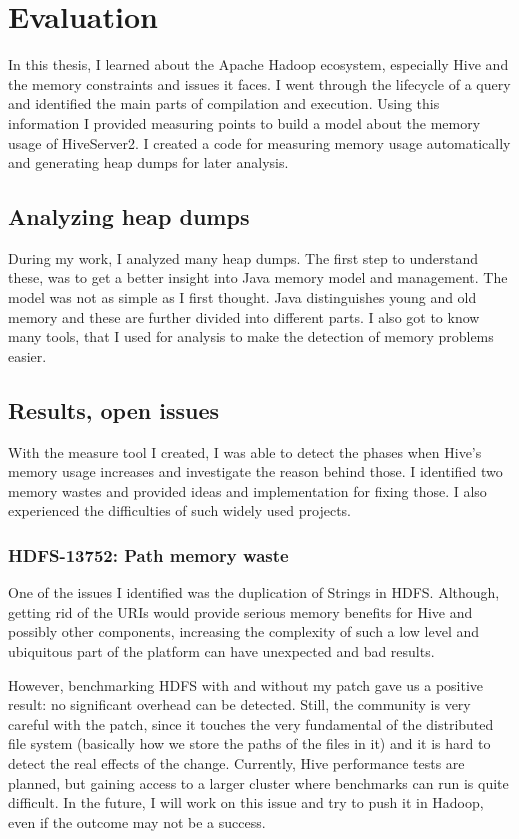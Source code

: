 \chapter{Evaluation}
In this thesis, I learned about the Apache Hadoop ecosystem, especially Hive and the memory constraints and issues it faces. I went through the lifecycle of a query and identified the main parts of compilation and execution. Using this information I provided measuring points to build a model about the memory usage of HiveServer2. I created a code for measuring memory usage automatically and generating heap dumps for later analysis.

\section{Analyzing heap dumps}
During my work, I analyzed many heap dumps. The first step to understand these, was to get a better insight into Java memory model and management. The model was not as simple as I first thought. Java distinguishes young and old memory and these are further divided into different parts. I also got to know many tools, that I used for analysis to make the detection of memory problems easier. 

\section{Results, open issues}
With the measure tool I created, I was able to detect the phases when Hive's memory usage increases and investigate the reason behind those. I identified two memory wastes and provided ideas and implementation for fixing those. I also experienced the difficulties of such widely used projects.

\subsection{HDFS-13752: Path memory waste}
One of the issues I identified was the duplication of Strings in HDFS. Although, getting rid of the URIs would provide serious memory benefits for Hive and possibly other components, increasing the complexity of such a low level and ubiquitous part of the platform can have unexpected and bad results. 

However, benchmarking HDFS with and without my patch gave us a positive result: no significant overhead can be detected. Still, the community is very careful with the patch, since it touches the very fundamental of the distributed file system (basically how we store the paths of the files in it) and it is hard to detect the real effects of the change. Currently, Hive performance tests are planned, but gaining access to a larger cluster where benchmarks can run is quite difficult. In the future, I will work on this issue and try to push it in Hadoop, even if the outcome may not be a success.

